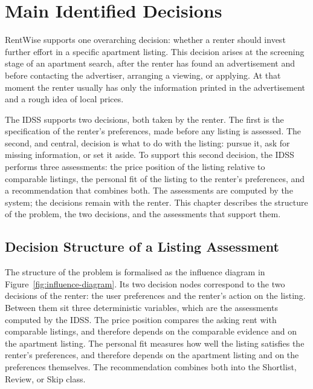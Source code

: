 \documentclass[12pt,a4paper]{report}
\begin{document}
\chapter{Main Identified Decisions}
\label{ch:decisions}

RentWise supports one overarching decision: whether a renter should invest
further effort in a specific apartment listing. This decision arises at the
screening stage of an apartment search, after the renter has found an
advertisement and before contacting the advertiser, arranging a viewing, or
applying. At that moment the renter usually has only the information printed
in the advertisement and a rough idea of local prices.

The IDSS supports two decisions, both taken by the renter. The first is the
specification of the renter's preferences, made before any listing is
assessed. The second, and central, decision is what to do with the listing:
pursue it, ask for missing information, or set it aside. To support this
second decision, the IDSS performs three assessments: the price position of
the listing relative to comparable listings, the personal fit of the listing
to the renter's preferences, and a recommendation that combines both. The
assessments are computed by the system; the decisions remain with the
renter. This chapter describes the structure of the problem, the two
decisions, and the assessments that support them.

\section{Decision Structure of a Listing Assessment}

The structure of the problem is formalised as the influence diagram in
Figure~\ref{fig:influence-diagram}. Its two decision nodes correspond to
the two decisions of the renter: the user preferences and the renter's
action on the listing. Between them sit three deterministic variables,
which are the assessments computed by the IDSS. The price position compares
the asking rent with comparable listings, and therefore depends on the
comparable evidence and on the apartment listing. The personal fit
measures how well the listing satisfies the renter's preferences, and
therefore depends on the apartment listing and on the preferences
themselves. The recommendation combines both into the Shortlist, Review,
or Skip class.
\end{document}
